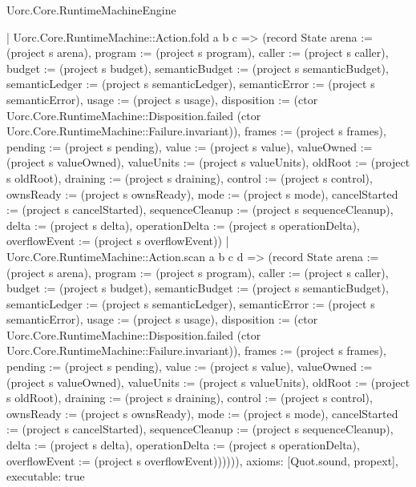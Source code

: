 \begin{lexlean}{Uorc.Core.RuntimeMachineEngine}
\begin{semanticmodule}
{      | Uorc.Core.RuntimeMachine::Action.fold a b c => (record State {arena := (project s arena), program := (project s program), caller := (project s caller), budget := (project s budget), semanticBudget := (project s semanticBudget), semanticLedger := (project s semanticLedger), semanticError := (project s semanticError), usage := (project s usage), disposition := (ctor Uorc.Core.RuntimeMachine::Disposition.failed (ctor Uorc.Core.RuntimeMachine::Failure.invariant)), frames := (project s frames), pending := (project s pending), value := (project s value), valueOwned := (project s valueOwned), valueUnits := (project s valueUnits), oldRoot := (project s oldRoot), draining := (project s draining), control := (project s control), ownsReady := (project s ownsReady), mode := (project s mode), cancelStarted := (project s cancelStarted), sequenceCleanup := (project s sequenceCleanup), delta := (project s delta), operationDelta := (project s operationDelta), overflowEvent := (project s overflowEvent)})
      | Uorc.Core.RuntimeMachine::Action.scan a b c d => (record State {arena := (project s arena), program := (project s program), caller := (project s caller), budget := (project s budget), semanticBudget := (project s semanticBudget), semanticLedger := (project s semanticLedger), semanticError := (project s semanticError), usage := (project s usage), disposition := (ctor Uorc.Core.RuntimeMachine::Disposition.failed (ctor Uorc.Core.RuntimeMachine::Failure.invariant)), frames := (project s frames), pending := (project s pending), value := (project s value), valueOwned := (project s valueOwned), valueUnits := (project s valueUnits), oldRoot := (project s oldRoot), draining := (project s draining), control := (project s control), ownsReady := (project s ownsReady), mode := (project s mode), cancelStarted := (project s cancelStarted), sequenceCleanup := (project s sequenceCleanup), delta := (project s delta), operationDelta := (project s operationDelta), overflowEvent := (project s overflowEvent)}))))),
  axioms: [Quot.sound, propext],
  executable: true
}


\end{semanticmodule}
\end{lexlean}

